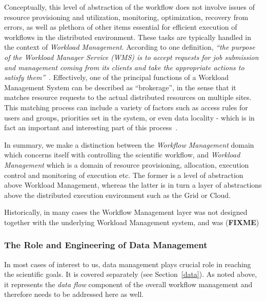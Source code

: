 Conceptually, this level of abstraction of the workflow does not  involve issues of resource provisioning and utilization, monitoring, optimization, recovery from errors, as well as plethora of other items essential
for efficient execution of workflows in the distributed environment. These tasks are typically handled in the context of \textit{Workload Management}. According to one definition,
\textit{``the purpose of the Workload Manager Service (WMS) is to accept requests for job submission and management coming from its clients and take the appropriate actions to satisfy them''}~\cite{egee_user_guide}.
Effectively, one of the principal functions of a Workload Management System can be described as ``brokerage'', in the sense that it matches resource requests to the actual distributed resources
on multiple sites. This matching process can include a variety of factors such as access rules for users and groups, priorities set in the system, or even data locality - which is in fact an important and interesting part of this process~\cite{panda_chep10}.

In summary, we make a distinction between the \textit{Workflow Management} domain which concerns itself with controlling the scientific workflow, and \textit{Workload Management} which
is a domain of resource provisioning, allocation, execution control and monitoring of execution etc. The former is a level of abstraction above Workload Management, whereas the latter is in
turn a layer of abstractions above the distributed execution environment such as the Grid or Cloud.

Historically, in many cases the Workflow Management layer was not designed together with the underlying Workload Management system, and was (\textbf{FIXME})

\subsubsection{The Role and Engineering of Data Management}
In most cases of interest to us, data management plays crucial role in reaching the scientific goals. It is covered separately (see Section~\ref{data}).
As noted above, it represents the \textit{data flow} component of the overall workflow management and therefore needs to be addressed here as well.


